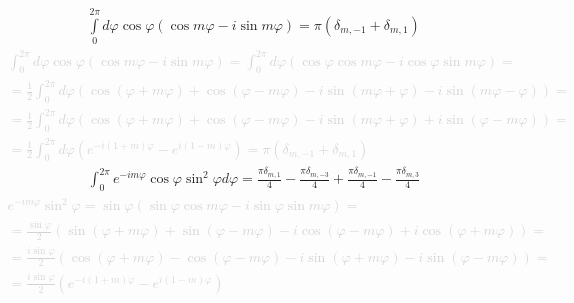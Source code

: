 %
\begin{equation} \begin{aligned} \label{eq:int_exp2}
\int \limits_{0}^{2\pi} d \varphi \cos \varphi 
( \cos m \varphi - i \sin m \varphi) = \pi ( \delta_{m,-1} + \delta_{m,1} )
\end{aligned} \end{equation}
%
\textcolor{lightgray}{ \begin{equation*} \begin{aligned}
\int_{0}^{2\pi} d \varphi \cos \varphi 
\left( \cos m \varphi - i \sin m \varphi \right) = \int_{0}^{2\pi} d \varphi
\left( \cos \varphi \cos m \varphi - i \cos \varphi \sin m \varphi \right) = \\
= \frac{1}{2} \int_{0}^{2\pi} d \varphi \left( 
\cos (\varphi + m \varphi) + \cos (\varphi - m \varphi) - 
i \sin (m \varphi + \varphi) - i \sin (m \varphi - \varphi) \right) = \\
= \frac{1}{2} \int_{0}^{2\pi} d \varphi \left( 
\cos (\varphi + m \varphi) + \cos (\varphi - m \varphi) - 
i \sin (m \varphi + \varphi) + i \sin (\varphi - m \varphi) \right) = \\
= \frac{1}{2} \int_{0}^{2\pi} d \varphi 
\left( e^{-i (1 + m) \varphi} - e^{i (1 - m) \varphi} \right) = 
\pi \left( \delta_{m,-1} + \delta_{m,1} \right)
\end{aligned} \end{equation*} }
%
\begin{equation} \begin{aligned} \label{eq:int_exp3}
\int_{0}^{2\pi} e^{-i m \varphi} \cos \varphi \sin^2 \varphi d \varphi = 
\frac{\pi \delta_{m,1} }{4}  - \frac{\pi \delta_{m,-3} }{4} + 
\frac{\pi \delta_{m,-1} }{4}  - \frac{\pi \delta_{m,3} }{4}
\end{aligned} \end{equation}
%
\textcolor{lightgray}{ \begin{equation*} \begin{aligned}
e^{-i m \varphi} \sin^2 \varphi = \sin \varphi \left( 
\sin \varphi \cos m \varphi - i \sin \varphi \sin m \varphi \right) = \\
= \frac{\sin \varphi}{2} \left( \sin (\varphi + m \varphi) + 
\sin (\varphi - m \varphi) - i \cos (\varphi - m \varphi) + 
i \cos (\varphi + m \varphi) \right) = \\ 
= \frac{i \sin \varphi}{2} \left( \cos (\varphi + m \varphi) - 
\cos (\varphi - m \varphi) - i \sin (\varphi + m \varphi) - 
i \sin (\varphi - m \varphi) \right) = \\
= \frac{i \sin \varphi}{2} \left( e^{-i(1+m)\varphi} - e^{i(1-m)\varphi} \right)
\end{aligned} \end{equation*} }

